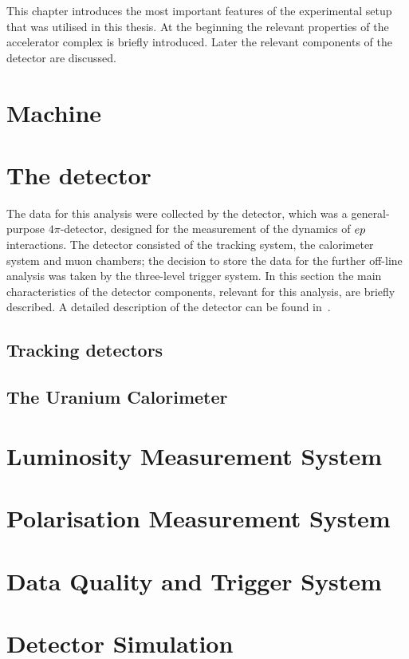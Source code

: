 This chapter introduces the most important features of the  experimental setup that was utilised in this thesis. At the beginning the relevant properties of the accelerator complex is briefly introduced. Later the relevant components of the \zeus detector are discussed.

\section{\hera Machine}
\label{sec:hera}


\section{The \zeus detector}
\label{subsec:zeusdet}
The data for this analysis were collected by the \zeus detector, which was a general-purpose $4\pi$-detector, designed for the measurement of the dynamics of $\mbox{$e p$}$ interactions. The \zeus detector consisted of the tracking system, the calorimeter system and muon chambers; the decision to store the data for the further off-line analysis was taken by the three-level trigger system. In this section the main characteristics of the detector components, relevant for this analysis, are briefly described. A detailed description of the detector can be found in~\cite{zeus:1993:bluebook}.


\subsection{Tracking detectors}
\label{subsec:trackdet}


\subsection{The Uranium Calorimeter}
\label{subsec:UCAL}


\section{Luminosity Measurement System}
\label{sec:lumimeas}


\section{Polarisation Measurement System}
\label{sec:polarmeas}


\section{Data Quality and Trigger System}
\label{sec:daqtrigger}


\section{Detector Simulation}
\label{sec:detsim}


